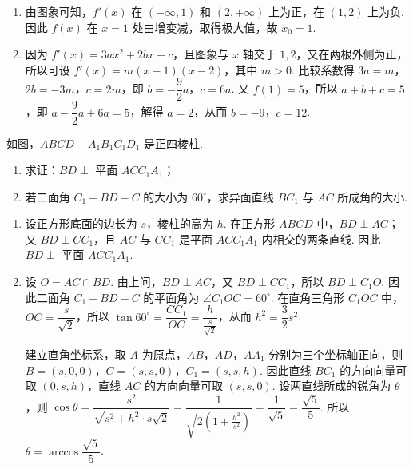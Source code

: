 \begin{solution}
\begin{enumerate}
\item 由图象可知，\(f'(x)\) 在 \((-\infty,1)\) 和 \((2,+\infty)\) 上为正，在 \((1,2)\) 上为负. 因此 \(f(x)\) 在 \(x=1\) 处由增变减，取得极大值，故 \(x_0=1\).
\item 因为 \(f'(x)=3ax^2+2bx+c\)，且图象与 \(x\) 轴交于 \(1,2\)，又在两根外侧为正，所以可设 \(f'(x)=m(x-1)(x-2)\)，其中 \(m>0\). 比较系数得 \(3a=m\)，\(2b=-3m\)，\(c=2m\)，即 \(b=-\dfrac92a\)，\(c=6a\). 又 \(f(1)=5\)，所以 \(a+b+c=5\)，即 \(a-\dfrac92a+6a=5\)，解得 \(a=2\)，从而 \(b=-9\)，\(c=12\).
\end{enumerate}
\end{solution}

\begin{problem}
如图，\(ABCD - A_{1}B_{1}C_{1}D_{1}\) 是正四棱柱.

\begin{enumerate}
\item 求证：\(BD \perp\) 平面 \(ACC_{1}A_{1}\)；
\item 若二面角 \(C_{1} - BD - C\) 的大小为 \(60^{\circ}\)，求异面直线 \(BC_{1}\) 与 \(AC\) 所成角的大小.
\end{enumerate}

\end{problem}

\begin{solution}
\begin{enumerate}
\item 设正方形底面的边长为 \(s\)，棱柱的高为 \(h\). 在正方形 \(ABCD\) 中，\(BD\perp AC\)；又 \(BD\perp CC_1\)，且 \(AC\) 与 \(CC_1\) 是平面 \(ACC_1A_1\) 内相交的两条直线. 因此 \(BD\perp\) 平面 \(ACC_1A_1\).
\item 设 \(O=AC\cap BD\). 由上问，\(BD\perp AC\)，又 \(BD\perp CC_1\)，所以 \(BD\perp C_1O\). 因此二面角 \(C_1-BD-C\) 的平面角为 \(\angle C_1OC=60^{\circ}\). 在直角三角形 \(C_1OC\) 中，\(OC=\dfrac{s}{\sqrt2}\)，所以 \(\tan60^{\circ}=\dfrac{CC_1}{OC}=\dfrac{h}{\frac{s}{\sqrt2}}\)，从而 \(h^2=\dfrac32s^2\).

建立直角坐标系，取 \(A\) 为原点，\(AB\)，\(AD\)，\(AA_1\) 分别为三个坐标轴正向，则 \(B=(s,0,0)\)，\(C=(s,s,0)\)，\(C_1=(s,s,h)\). 因此直线 \(BC_1\) 的方向向量可取 \((0,s,h)\)，直线 \(AC\) 的方向向量可取 \((s,s,0)\). 设两直线所成的锐角为 \(\theta\)，则
\(\cos\theta=\dfrac{s^2}{\sqrt{s^2+h^2}\cdot s\sqrt2}=\dfrac{1}{\sqrt{2\left(1+\frac{h^2}{s^2}\right)}}=\dfrac{1}{\sqrt5}=\dfrac{\sqrt5}{5}\).
所以 \(\theta=\arccos\dfrac{\sqrt5}{5}\).
\end{enumerate}
\end{solution}

